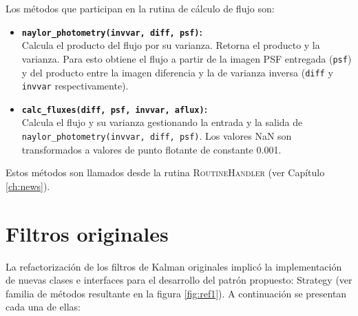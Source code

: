 Los m\'etodos que participan en la rutina de c\'alculo de flujo son: 

\begin{itemize}
\item \textbf{\texttt{naylor\_photometry(invvar, diff, psf)}\cite{naylor}:}\\
Calcula el producto del flujo por su varianza. Retorna el producto y la varianza. Para esto obtiene el flujo a partir de la imagen PSF entregada (\texttt{psf}) y del producto entre la imagen diferencia y la de varianza inversa (\texttt{diff} y \texttt{invvar} respectivamente)\cite{naylor}.
\bigskip


\item \textbf{\texttt{calc\_fluxes(diff, psf, invvar, aflux)}:}\\
Calcula el flujo y su varianza gestionando la entrada y la salida de \texttt{naylor\_photometry(invvar, diff, psf)}. Los valores NaN son transformados a valores de punto flotante de constante 0.001.
\end{itemize} 

Estos m\'etodos  son llamados desde la rutina \textsc{RoutineHandler} (ver Cap\'itulo \ref{ch:news}).
\section{Filtros originales}
La refactorizaci\'on de los filtros de Kalman originales implic\'o la implementaci\'on de nuevas clases e interfaces para el desarrollo del patr\'on propuesto: Strategy (ver familia de m\'etodos resultante en la figura \ref{fig:ref1}). A continuaci\'on se presentan cada una de ellas:

